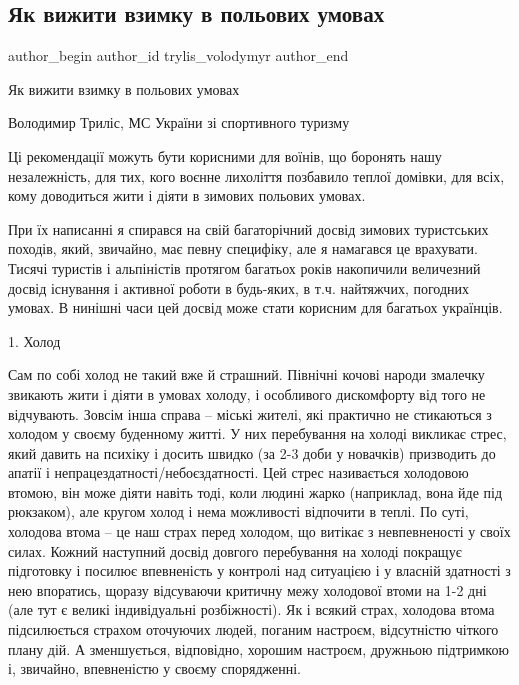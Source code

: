  
 
 
 
 
 
\subsection{Як вижити взимку в польових умовах}
\label{sec:13_12_2022.fb.trylis_volodymyr.1.vyzhyty_vzymku}
 
\ifcmt
 author_begin
   author_id trylis_volodymyr
 author_end
\fi

Як вижити взимку в польових умовах

Володимир Триліс, МС України зі спортивного туризму

Ці рекомендації можуть бути корисними для воїнів, що боронять нашу
незалежність, для тих, кого воєнне лихоліття позбавило теплої домівки, для
всіх, кому доводиться жити і діяти в зимових польових умовах.

При їх написанні я спирався на свій багаторічний досвід зимових туристських
походів, який, звичайно, має певну специфіку, але я намагався це врахувати.
Тисячі туристів і альпіністів протягом багатьох років накопичили величезний
досвід існування і активної роботи в будь-яких, в т.ч. найтяжчих, погодних
умовах. В нинішні часи цей досвід може стати корисним для багатьох українців.

1. Холод

Сам по собі холод не такий вже й страшний. Північні кочові народи змалечку
звикають жити і діяти в умовах холоду, і особливого дискомфорту від того не
відчувають. Зовсім інша справа – міські жителі, які практично не стикаються з
холодом у своєму буденному житті. У них перебування на холоді викликає стрес,
який давить на психіку і досить швидко (за 2-3 доби у новачків) призводить до
апатії і непрацездатності/небоєздатності. Цей стрес називається холодовою
втомою, він може діяти навіть тоді, коли людині жарко (наприклад, вона йде під
рюкзаком), але кругом холод і нема можливості відпочити в теплі. По суті,
холодова втома – це наш страх перед холодом, що витікає з невпевненості у своїх
силах. Кожний наступний досвід довгого перебування на холоді покращує
підготовку і посилює впевненість у контролі над ситуацією і у власній здатності
з нею впоратись, щоразу відсуваючи критичну межу холодової втоми на 1-2 дні
(але тут є великі індивідуальні розбіжності). Як і всякий страх, холодова втома
підсилюється страхом оточуючих людей, поганим настроєм, відсутністю чіткого
плану дій. А зменшується, відповідно, хорошим настроєм, дружньою підтримкою і,
звичайно, впевненістю у своєму спорядженні. 

